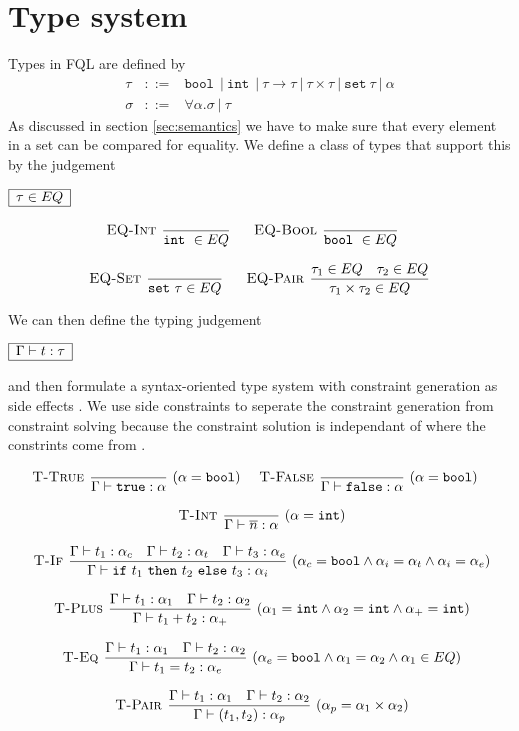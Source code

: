 \documentclass[a4paper]{article}
\newcommand{\pipe}{\ | \ }
\newcommand{\s}[1]{\mathtt{#1}}
\newcommand{\sn}{\overline{n}}
\newcommand{\sbool}{\s{bool\ }}
\newcommand{\sint}{\s{int\ }}
\newcommand{\sseta}{\s{set\ }}
\newcommand{\sif}{\s{if\ }}
\newcommand{\sthen}{\s{\ then\ }}
\newcommand{\selse}{\s{\ else\ }}
\newcommand{\strue}{\s{true}}
\newcommand{\sfalse}{\s{false}}
\renewcommand{\rule}[3][]{\ \mbox{\textsc{#1 }}\dfrac{#2}{#3}\ }
\newcommand{\smbox}[1]{
  $\begin{array}{|c|}
    \hline
    #1 \\
    \hline
  \end{array}$
}
\begin{document}
\section{Type system}
\label{sec:typeSystem}

Types in FQL are defined by
\begin{eqnarray*}
\tau &::=& \sbool \pipe \sint \pipe \tau \to \tau \pipe \tau \times \tau \pipe \sseta \tau \pipe \alpha\\
\sigma &::=& \forall \alpha. \sigma \pipe \tau
\end{eqnarray*}
As discussed in section \ref{sec:semantics} we have to make sure
that every element in a set can be compared for equality. We define
a class of types that support this by the judgement
\smbox{\tau \in EQ}
\[\begin{array}{c}
\rule[EQ-Int]{}{\sint \in EQ}\quad
\rule[EQ-Bool]{}{\sbool \in EQ}\quad\\\\
\rule[EQ-Set]{}{\sseta \tau \in EQ}\quad
\rule[EQ-Pair]{\tau_1 \in EQ \quad \tau_2 \in EQ}{\tau_1 \times \tau_2 \in EQ}
\end{array}\]

We can then define the typing judgement
\smbox{\Gamma \vdash t : \tau}
and then formulate a syntax-oriented type system with constraint generation as side effects \cite{Heeren02generalizinghindley-milner, Henglein89polymorphictype}. We use side constraints to seperate the constraint generation from constraint solving because the constraint solution is independant of where the constrints come from \cite{henglein94fund-type-inf-sys}.


\[\begin{array}{c}
\rule[T-True]{}{\Gamma \vdash \strue : \alpha}(\alpha = \s{bool})\quad
\rule[T-False]{}{\Gamma \vdash \sfalse : \alpha}(\alpha = \s{bool})\quad
\\\\
\rule[T-Int]{}{\Gamma \vdash \sn : \alpha}(\alpha = \s{int})
\\\\
\rule[T-If]{\Gamma\vdash t_1 : \alpha_c \quad \Gamma\vdash t_2 : \alpha_t \quad \Gamma\vdash t_3 : \alpha_e}
{\Gamma\vdash \sif t_1 \sthen t_2 \selse t_3 : \alpha_i}
(\alpha_c = \s{bool} \wedge \alpha_i = \alpha_t \wedge \alpha_i = \alpha_e)
\\\\
\rule[T-Plus]{\Gamma\vdash t_1 : \alpha_1
\quad \Gamma\vdash t_2 : \alpha_2}
{\Gamma\vdash t_1 + t_2 : \alpha_+}
(\alpha_1 = \s{int} \wedge \alpha_2 = \s{int} \wedge \alpha_+ = \s{int})
\\\\
\rule[T-Eq]{\Gamma\vdash t_1 : \alpha_1 
\quad \Gamma\vdash t_2 : \alpha_2}
{\Gamma\vdash t_1 = t_2 : \alpha_e}
(\alpha_e = \s{bool} \wedge \alpha_1 = \alpha_2 \wedge \alpha_1 \in EQ)
\\\\
\rule[T-Pair]{\Gamma\vdash t_1 : \alpha_1
\quad \Gamma \vdash t_2 : \alpha_2}
{\Gamma \vdash (t_1, t_2) : \alpha_p}
(\alpha_p = \alpha_1 \times \alpha_2)
\end{array}\]
\end{document}
